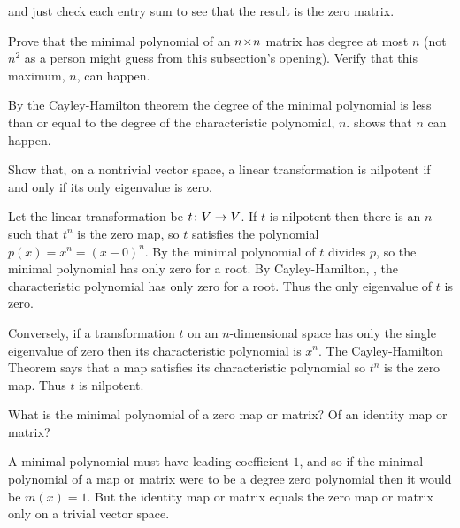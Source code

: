 \begin{exercises}
\begin{answer}
      and just check each entry sum to see that the result is the zero matrix.
    \end{answer}
  \recommended \item
    Prove that the minimal polynomial of an \( n \! \times \! n \) matrix has
    degree at most \( n \) (not \( n^2 \) as a person might guess from this
    subsection's opening).
    Verify that this maximum, \( n \), can happen.
    \begin{answer}
      By the Cayley-Hamilton theorem the degree of the minimal polynomial is
      less than or equal to the degree of the characteristic polynomial,
      \( n \).
       shows that \( n \) can happen.
    \end{answer}
   \recommended \item 
     Show that, on a nontrivial vector space, a linear transformation is 
     nilpotent if and only if its only eigenvalue is zero.
     \begin{answer}
       Let the linear transformation be $\mbox{$t\colon V\to V$}$.
       If $t$ is nilpotent then there is an $n$ such that $t^n$ is the zero map,
       so $t$ satisfies the polynomial $p(x)=x^n=(x-0)^n$.
       By  the minimal polynomial of 
       $t$ divides $p$, so the minimal polynomial has only zero for a root.
       By Cayley-Hamilton, ,
       the characteristic polynomial has only zero for a root.
       Thus the only eigenvalue of $t$ is zero.

       Conversely, if a transformation \( t \) on an
       \( n \)-dimensional space has only the single eigenvalue of zero 
       then its characteristic polynomial is \( x^n \). 
       The Cayley-Hamilton Theorem says that a map satisfies its
       characteristic polynomial so \( t^n \) is the zero map.
       Thus $t$ is nilpotent.
     \end{answer}
   \item 
       What is the minimal polynomial of a zero map or matrix?
       Of an identity map or matrix?
       \begin{answer}
         A minimal polynomial must have leading coefficient $1$, 
         and so if the minimal polynomial of a map or matrix were to 
         be a degree zero polynomial then it would be $m(x)=1$.
         But the identity map or matrix equals the zero map or matrix
         only on a trivial vector space.


\end{answer}
\end{exercises}
